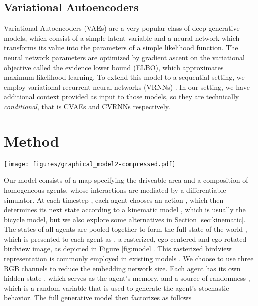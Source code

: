 \documentclass[letterpaper, 10 pt, conference]{ieeeconf}
\begin{document}
\subsection{Variational Autoencoders}

Variational Autoencoders (VAEs) \cite{kingma_auto-encoding_2014} are a very popular class of deep generative models, which consist of a simple latent variable and a neural network which transforms its value into the parameters of a simple likelihood function. The neural network parameters are optimized by gradient ascent on the variational objective called the evidence lower bound (ELBO), which approximates maximum likelihood learning. To extend this model to a sequential setting, we employ variational recurrent neural networks (VRNNs) \cite{chung_recurrent_2016}. In our setting, we have additional context provided as input to those models, so they are technically  \emph{conditional}, that is CVAEs and CVRNNs respectively.

\section{Method}

\begin{figure*}
    \centering
    \texttt{[image: figures/graphical\_model2-compressed.pdf]}
    \caption{A schematic illustration of ITRA's architecture. The agents choose the actions at each time step independently from each other, obtaining information about other agents and the environment only through ego-centered birdview images. This representation naturally accommodates an unbounded, variable number of agents and time steps. The actions are translated into new agent states using a kinematic model not shown on the diagram. The colored bounding boxes illustrate each agent's field of view in the full scene.}
    \label{fig:model}
\end{figure*}

Our model consists of a map specifying the driveable area and a composition of homogeneous agents, whose interactions are mediated by a differentiable simulator. At each timestep , each agent  chooses an action , which then determines its next state according to a kinematic model , which is usually the bicycle model, but we also explore some alternatives in Section \ref{sec:kinematic}. The states of all agents are pooled together to form the full state of the world , which is presented to each agent as , a rasterized, ego-centered and ego-rotated birdview image, as depicted in Figure \ref{fig:model}. This rasterized birdview representation is commonly employed in existing models \cite{djuric_uncertainty-aware_2020, zhao_multi-agent_2019, tang_multiple_2019}. We choose to use three RGB channels to reduce the embedding network size. Each agent has its own hidden state , which serves as the agent's memory, and a source of randomness , which is a random variable that is used to generate the agent's stochastic behavior. The full generative model then factorizes as follows
\end{document}
